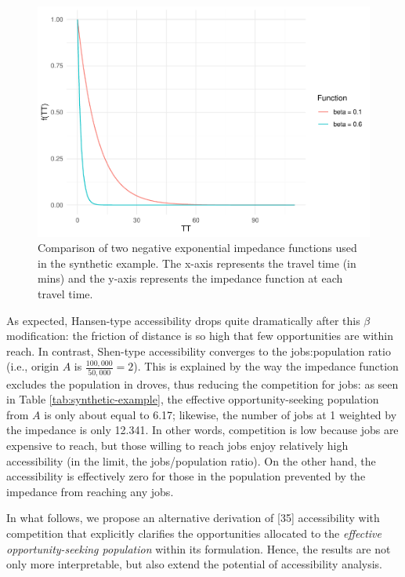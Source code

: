 \documentclass[10pt,letterpaper]{article}
\begin{document}
\begin{figure}
\includegraphics[width=1\linewidth]{Spatial-Availability-Paper_files/figure-latex/comparison-impedance-functions-synthetic-example-1} \caption{\label{fig:impedance-functions-comparison}Comparison of two negative exponential impedance functions used in the synthetic example. The x-axis represents the travel time (in mins) and the y-axis represents the impedance function at each travel time.}\label{fig:comparison-impedance-functions-synthetic-example}
\end{figure}

As expected, Hansen-type accessibility drops quite dramatically after
this \(\beta\) modification: the friction of distance is so high that
few opportunities are within reach. In contrast, Shen-type accessibility
converges to the jobs:population ratio (i.e., origin \(A\) is
\(\frac{100,000}{50,000} = 2\)). This is explained by the way the
impedance function excludes the population in droves, thus reducing the
competition for jobs: as seen in Table \ref{tab:synthetic-example}, the
effective opportunity-seeking population from \(A\) is only about equal
to 6.17; likewise, the number of jobs at 1 weighted by the impedance is
only 12.341. In other words, competition is low because jobs are
expensive to reach, but those willing to reach jobs enjoy relatively
high accessibility (in the limit, the jobs/population ratio). On the
other hand, the accessibility is effectively zero for those in the
population prevented by the impedance from reaching any jobs.

In what follows, we propose an alternative derivation of {[}35{]}
accessibility with competition that explicitly clarifies the
opportunities allocated to the \emph{effective opportunity-seeking
population} within its formulation. Hence, the results are not only more
interpretable, but also extend the potential of accessibility analysis.
\end{document}
